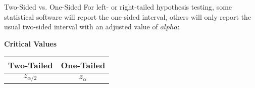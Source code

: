 \documentclass[t]{beamer}
\begin{document}
\begin{frame}{Two-Sided vs. One-Sided}
For left- or right-tailed hypothesis testing, some statistical software will report the one-sided interval, others will only report the usual two-sided interval with an adjusted value of $alpha$:	\newline\\

\begin{center}
\textbf{Critical Values} \newline\\
\begin{tabular}{c|c}
Two-Tailed & One-Tailed \\ \hline
$z_{\alpha/2}$ & $z_{\alpha}$ \\
\end{tabular}
\end{center}
\end{frame}
\end{document}
